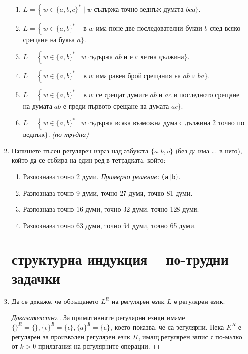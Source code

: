 \documentclass[a4paper]{scrartcl}
\newcommand{\langdef}[5] { %
    \ensuremath{#1 = \left\{ #2 \in \{#3\}^* \mid #4 \right.} #5\ensuremath{\}.} 
}
\newcommand{\harder}{\emph{(по-трудна)}}
\begin{document}
\begin{enumerate}
\begin{enumerate}
            \item \langdef{L}{w}{a,b,c}{w}{съдържа точно веднъж думата $bca$}

            \item \langdef{L}{w}{a,b}{}{в $w$ има поне две последователни букви $b$ след всяко срещане на буква $a$}

            \item \langdef{L}{w}{a,b}{w}{съдържа $ab$ и е с четна дължина}

            \item \langdef{L}{w}{a,b}{}{в $w$ има равен брой срещания на $ab$ и $ba$}

            \item \langdef{L}{w}{a,b}{}{в $w$ се срещат думите $ab$ и $ac$ и последното срещане на думата $ab$ е преди първото срещане на думата $ac$}

            \item \langdef{L}{w}{a,b}{w}{съдържа всяка възможна дума с дължина 2 точно по веднъж} \harder
        \end{enumerate}

    \item Напишете пълен регулярен израз над азбуката $\{a, b, c\}$ (без да има ... в него), който да се събира на един ред в тетрадката, който:
        \begin{enumerate}
            \item Разпознава точно 2 думи.
                \emph{Примерно решение:} \texttt{(a|b)}.
            \item Разпознава точно 9 думи, точно 27 думи, точно 81 думи.
            \item Разпознава точно 16 думи, точно 32 думи, точно 128 думи.
            \item Разпознава точно 63 думи, точно 64 думи, точно 65 думи.
        \end{enumerate}

    \section*{структурна индукция -- по-трудни задачки}

    \item Да се докаже, че обръщането $L^R$ на регулярен език $L$ е регулярен език.
        \begin{proof}[Доказателство.] За примитивните регулярни езици имаме $\{\}^R = \{\}, \{\epsilon\}^R = \{\epsilon\},
            \{a\}^R = \{a\}$, което показва, че са регулярни.  Нека $K^R$ е регулярен за произволен регулярен език $K$, имащ регулярен
            запис с по-малко от $k > 0$ прилагания на регулярните операции. 
        

\end{proof}
\end{enumerate}
\end{document}
